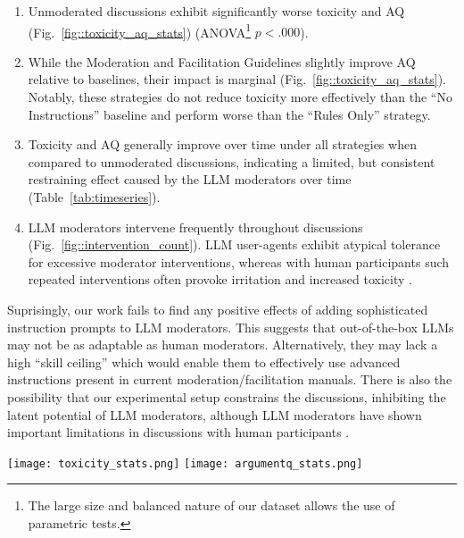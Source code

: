 \begin{enumerate}
    \item Unmoderated discussions exhibit significantly worse toxicity and \ac{AQ} (Fig.~\ref{fig::toxicity_aq_stats}) (ANOVA\footnote{The large size and balanced nature of our dataset allows the use of parametric tests.} $p<.000$).

    \item  While the Moderation and Facilitation Guidelines slightly improve \ac{AQ} relative to baselines, their impact is marginal (Fig.~\ref{fig::toxicity_aq_stats}). Notably, these strategies do not reduce toxicity more effectively than the “No Instructions” baseline and perform worse than the “Rules Only” strategy.

    \item Toxicity and \ac{AQ} generally improve over time under all strategies when compared to unmoderated discussions, indicating a limited, but consistent restraining effect caused by the \ac{LLM} moderators over time (Table~\ref{tab:timeseries}).

    \item \ac{LLM} moderators intervene frequently throughout discussions (Fig.~\ref{fig::intervention_count}). \ac{LLM} user-agents exhibit atypical tolerance for excessive moderator interventions, whereas with human participants such repeated interventions often provoke irritation and increased toxicity \cite{schaffner_community_guidelines, make_reddit_great, proactive_moderation, cresci_pesonalized_interventions}.
\end{enumerate}

Suprisingly, our work fails to find any positive effects of adding sophisticated instruction prompts to \ac{LLM} moderators. This suggests that out-of-the-box \acp{LLM} may not be as adaptable as human moderators. Alternatively, they may lack a high “skill ceiling” which would enable them to effectively use advanced instructions present in current moderation/facilitation manuals. There is also the possibility that our experimental setup constrains the discussions, inhibiting the latent potential of \ac{LLM} moderators, although \ac{LLM} moderators have shown important limitations in discussions with human participants \cite{cho-etal-2024-language}.


\begin{figure*}[t]
    \texttt{[image: toxicity\_stats.png]} \hfill
    \texttt{[image: argumentq\_stats.png]}
	\centering
	\caption{Comparison of mean Toxicity (left) and \ac{AQ} (right) between each moderation strategy. $A[i, j] = 0.3^{***}$ indicates that the strategy $i$ leads to overall worse discussions (more toxicity/worse arguments) compared to $j$ for an average of $0.3$ annotation levels ($1-5$) with $p<0.001$. The matrix is symmetrical. Each comparison is accompanied by pairwise student-t tests, in the form of significance asterisks.}
	\label{fig::toxicity_aq_stats}
\end{figure*}

